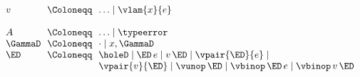 \begin{flushleft}

\\
$\begin{array}{l@{~~}c@{~~}l}
  v & \Coloneqq & \ldots \mid \vlam{x}{e}
\\ & &
\\
  A & \Coloneqq & \ldots \mid \typeerror
\\
  \GammaD & \Coloneqq & \cdot \mid x,\GammaD
\\
  \ED & \Coloneqq & \holeD \mid \ED\,e \mid v\,\ED \mid \vpair{\ED}{e} \mid
\\ & & \vpair{v}{\ED} \mid \vunop\,\ED \mid \vbinop\,\ED\,e \mid \vbinop\,v\,\ED
\end{array}$

\bigskip
{}
\begin{mathpar}






\end{mathpar}


\end{flushleft}
